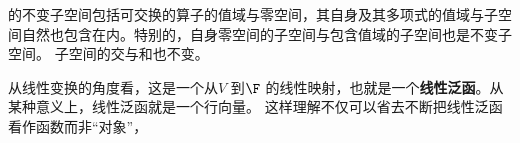 的不变子空间包括可交换的算子的值域与零空间，其自身及其多项式的值域与子空间自然也包含在内。特别的，自身零空间的子空间与包含值域的子空间也是不变子空间。
子空间的交与和也不变。

从线性变换的角度看，这是一个从\(V\) 到\(\F\) 的线性映射，也就是一个\textbf{线性泛函}。从某种意义上，线性泛函就是一个行向量。
这样理解不仅可以省去不断把线性泛函看作函数而非``对象''，
